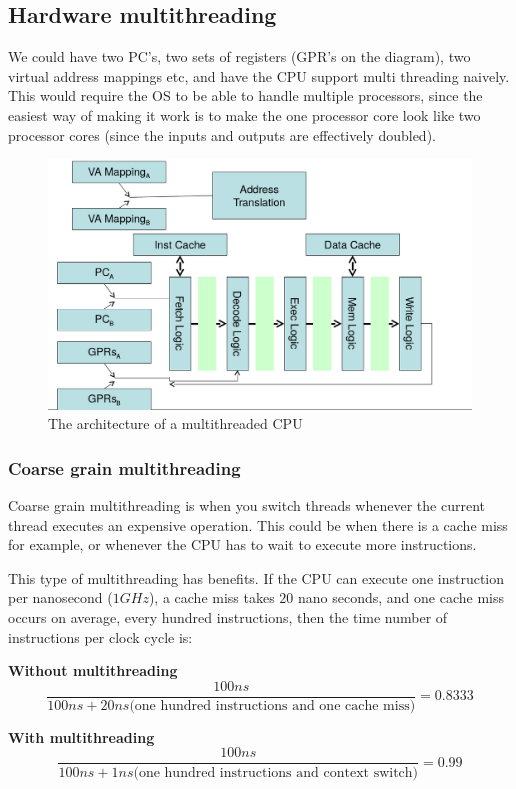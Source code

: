 \subsection{Hardware multithreading}

We could have two PC's, two sets of registers (GPR's on the diagram), two
virtual address mappings etc, and have the CPU support multi threading naively.
This would require the OS to be able to handle multiple processors, since the
easiest way of making it work is to make the one processor core look like two
processor cores (since the inputs and outputs are effectively doubled).

\begin{figure}[H]
  \centering
  \includegraphics[width=\textwidth]{images/hyperthreading}
  \caption{The architecture of a multithreaded CPU}
  \label{hyperthreading}
\end{figure}

\subsubsection{Coarse grain multithreading}

Coarse grain multithreading is when you switch threads whenever the current
thread executes an expensive operation. This could be when there is a cache miss
for example, or whenever the CPU has to wait to execute more instructions.

This type of multithreading has benefits. If the CPU can execute one instruction
per nanosecond ($1GHz$), a cache miss takes $20$ nano seconds, and one cache
miss occurs on average, every hundred instructions, then the time number of
instructions per clock cycle is:

\begin{description}
  \item \textbf{Without multithreading}
    \[
      \frac{100ns}{100ns + 20ns \text{(one hundred instructions and one cache miss)}} = 0.8333
    \]
  \item \textbf{With multithreading}
    \[
      \frac{100ns}{100ns + 1ns \text{(one hundred instructions and context switch)}} = 0.99
    \]
\end{description}

